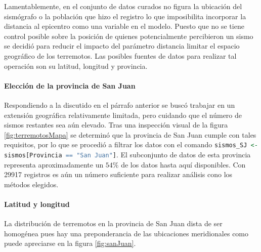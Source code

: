 \documentclass[a4paper]{report}
\begin{document}
Lamentablemente, en el conjunto de datos curados no figura la ubicación del sismógrafo o la población que hizo el registro lo que imposibilita incorporar la distancia al epicentro como una variable en el modelo.%
Puesto que no se tiene control posible sobre la posición de quienes potencialmente percibieron un sismo se decidió para reducir el impacto del parámetro distancia limitar el espacio geográfico de los terremotos.
Las posibles fuentes de datos para realizar tal operación son su latitud, longitud y provincia.


\paragraph{Elección de la provincia de San Juan}
Respondiendo a la discutido en el párrafo anterior se buscó trabajar en un extensión geográfica relativamente limitada, pero cuidando que el número de sismos restantes sea aún elevado.
Tras una inspección visual de la figura \ref{fig:terremotosMapa} se determinó  que la provincia de San Juan cumple con tales requisitos, por lo que se procedió a filtrar los datos con el comando \lstinline[language = R]'sismos_SJ <- sismos[Provincia == "San Juan"]'.
El subconjunto de datos de esta provincia representa aproximadamente un \(54 \%\) de los datos hasta aquí disponibles.
Con \num{29917} registros es aún un número suficiente para realizar análisis cono los métodos elegidos.



\paragraph{Latitud y longitud}
La distribución de terremotos en la provincia de San Juan dista de ser homogénea pues hay una preponderancia de las ubicaciones meridionales como puede apreciarse en la figura \ref{fig:sanJuan}.
\end{document}
